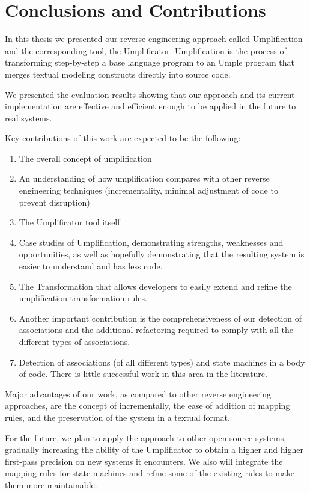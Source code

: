 \lhead{\emph{\leftmark}}  %
\chapter{Conclusions and Contributions}
\label{chap:conclusion}
In this thesis we presented our reverse engineering approach called Umplification and the corresponding tool, the Umplificator. Umplification is the process of transforming step-by-step a base language program to an Umple program that merges textual modeling constructs directly into source code. 

We presented the evaluation results showing that our approach and its current implementation are effective and efficient enough to be applied in the future to real systems. 

Key contributions of this work are expected to be the following:
\begin{enumerate}
\item The overall concept of umplification
\item An understanding of how umplification compares with other reverse engineering techniques (incrementality, minimal adjustment of code to prevent disruption)
\item The Umplificator tool itself
\item Case studies of Umplification, demonstrating strengths, weaknesses and opportunities, as well as hopefully demonstrating that the resulting system is easier to understand and has less code.
\item The Transformation that allows developers to easily extend and refine the umplification transformation rules.
\item Another important contribution is the comprehensiveness of our detection of associations and the additional refactoring required to comply with all the different types of associations.
\item Detection of associations (of all different types) and state machines in a body of code. There is little successful work in this area in the literature.
\end{enumerate}

Major advantages of our work, as compared to other reverse engineering approaches, are the concept of incrementally, the ease of addition of mapping rules, and the preservation of the system in a textual format.

For the future, we plan to apply the approach to other open source systems, gradually increasing the ability of the Umplificator to obtain a higher and higher first-pass precision on new systems it encounters. We also will integrate the mapping rules for state machines and refine some of the existing rules to make them more maintainable.
